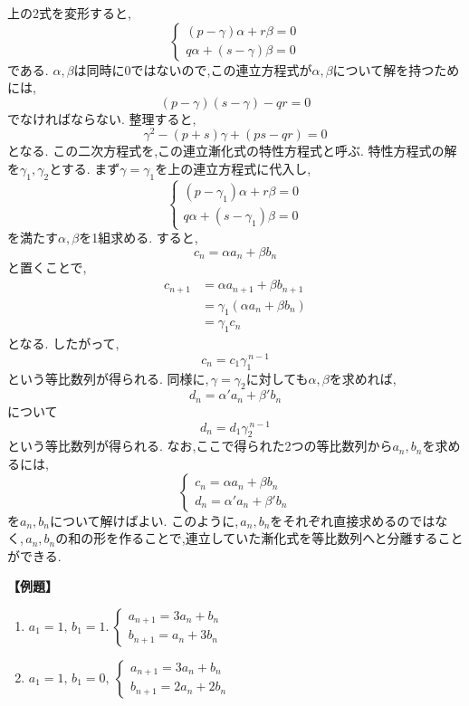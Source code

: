 上の2式を変形すると,
\[
  \begin{cases}
    (p-\gamma)\alpha+r\beta=0 \\
    q\alpha+(s-\gamma)\beta=0
  \end{cases}
\]
である.
$\alpha,\beta$は同時に$0$ではないので,この連立方程式が$\alpha,\beta$について解を持つためには,
\[
  (p-\gamma)(s-\gamma)-qr=0
\]
でなければならない.
整理すると,
\[
  \gamma^2-(p+s)\gamma+(ps-qr)=0
\]
となる.
この二次方程式を,この連立漸化式の特性方程式と呼ぶ.
特性方程式の解を$\gamma_1,\gamma_2$とする.
まず$\gamma=\gamma_1$を上の連立方程式に代入し,
\[
  \begin{cases}
    (p-\gamma_1)\alpha+r\beta=0 \\
    q\alpha+(s-\gamma_1)\beta=0
  \end{cases}
\]
を満たす$\alpha,\beta$を1組求める.
すると,
\[
  c_n=\alpha a_n+\beta b_n
\]
と置くことで,
\begin{align*}
  c_{n+1} & =\alpha a_{n+1}+\beta b_{n+1}   \\
          & =\gamma_1(\alpha a_n+\beta b_n) \\
          & =\gamma_1c_n
\end{align*}
となる.
したがって,
\[
  c_n=c_1\gamma_1^{\,n-1}
\]
という等比数列が得られる.
同様に,\,$\gamma=\gamma_2$に対しても$\alpha,\beta$を求めれば,
\[
  d_n=\alpha' a_n+\beta' b_n
\]
について
\[
  d_n=d_1\gamma_2^{\,n-1}
\]
という等比数列が得られる.
なお,ここで得られた2つの等比数列から$a_n,b_n$を求めるには,
\[
  \begin{cases}
    c_n=\alpha a_n+\beta b_n \\
    d_n=\alpha'a_n+\beta'b_n
  \end{cases}
\]
を$a_n,b_n$について解けばよい.
このように,\,$a_n,b_n$をそれぞれ直接求めるのではなく,\,$a_n,b_n$の和の形を作ることで,連立していた漸化式を等比数列へと分離することができる.

\noindent \textbf{【例題】}
\begin{enumerate}[label=(\arabic*),parsep=3pt]
  \item $\displaystyle a_1=1,\,b_1=1.\ \begin{cases}a_{n+1}=3a_n+b_n\\ b_{n+1}=a_n+3b_n\end{cases}$
  \item $\displaystyle a_1=1,\,b_1=0,\ \begin{cases}a_{n+1}=3a_n+b_n\\ b_{n+1}=2a_n+2b_n\end{cases}$
\end{enumerate}

